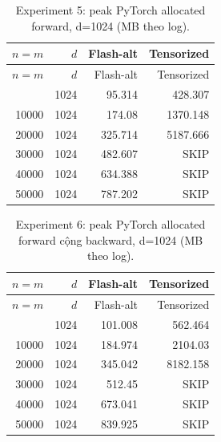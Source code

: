 \documentclass[11pt,a4paper]{article}
\newcommand{\SKIP}{\textnormal{SKIP}}
\begin{document}
\begingroup\small
\begin{longtable}{@{}rrrr@{}}
\caption{Experiment 5: peak PyTorch allocated forward, d=1024 (MB theo log).}\label{tab:memory-forward}\\
\toprule
$n=m$ & $d$ & Flash-alt & Tensorized \\
\midrule
\endfirsthead
\toprule
$n=m$ & $d$ & Flash-alt & Tensorized \\
\midrule
\endhead
\bottomrule
\endfoot
5000 & 1024 & 95.314 & 428.307 \\
10000 & 1024 & 174.08 & 1370.148 \\
20000 & 1024 & 325.714 & 5187.666 \\
30000 & 1024 & 482.607 & \SKIP \\
40000 & 1024 & 634.388 & \SKIP \\
50000 & 1024 & 787.202 & \SKIP \\
\end{longtable}
\endgroup

\begingroup\small
\begin{longtable}{@{}rrrr@{}}
\caption{Experiment 6: peak PyTorch allocated forward cộng backward, d=1024 (MB theo log).}\label{tab:memory-backward}\\
\toprule
$n=m$ & $d$ & Flash-alt & Tensorized \\
\midrule
\endfirsthead
\toprule
$n=m$ & $d$ & Flash-alt & Tensorized \\
\midrule
\endhead
\bottomrule
\endfoot
5000 & 1024 & 101.008 & 562.464 \\
10000 & 1024 & 184.974 & 2104.03 \\
20000 & 1024 & 345.042 & 8182.158 \\
30000 & 1024 & 512.45 & \SKIP \\
40000 & 1024 & 673.041 & \SKIP \\
50000 & 1024 & 839.925 & \SKIP \\
\end{longtable}
\endgroup
\end{document}
